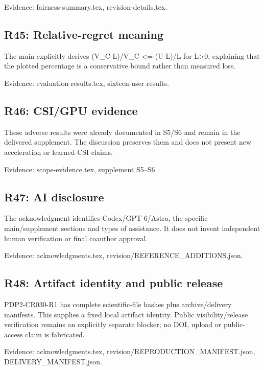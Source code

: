 \documentclass[10pt]{article}
\begin{document}
{\small Evidence: fairness-summary.tex, revision-details.tex.}

\subsection*{R45: Relative-regret meaning}

The main explicitly derives (V\_\allowbreak C-L)/\allowbreak V\_\allowbreak C <= (U-L)/\allowbreak L for L>0, explaining that the plotted percentage is a conservative bound rather than measured loss.

{\small Evidence: evaluation-results.tex, sixteen-user results.}

\subsection*{R46: CSI/\allowbreak GPU evidence}

These adverse results were already documented in S5/\allowbreak S6 and remain in the delivered supplement. The discussion preserves them and does not present new acceleration or learned-CSI claims.

{\small Evidence: scope-evidence.tex, supplement S5--S6.}

\subsection*{R47: AI disclosure}

The acknowledgment identifies Codex/\allowbreak GPT-6/\allowbreak Astra, the specific main/\allowbreak supplement sections and types of assistance. It does not invent independent human verification or final coauthor approval.

{\small Evidence: acknowledgments.tex, revision/\allowbreak REFERENCE\_\allowbreak ADDITIONS.json.}

\subsection*{R48: Artifact identity and public release}

PDP2-CR030-R1 has complete scientific-file hashes plus archive/\allowbreak delivery manifests. This supplies a fixed local artifact identity. Public visibility/\allowbreak release verification remains an explicitly separate blocker; no DOI, upload or public-access claim is fabricated.

{\small Evidence: acknowledgments.tex, revision/\allowbreak REPRODUCTION\_\allowbreak MANIFEST.json, DELIVERY\_\allowbreak MANIFEST.json.}
\end{document}

